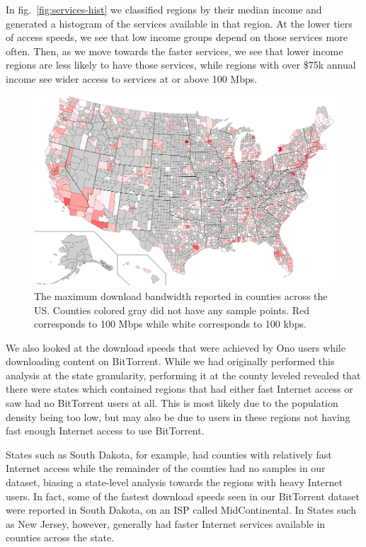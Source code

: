 \documentclass{sig-alternate-10pt}
\begin{document}
In fig.~\ref{fig:services-hist} we classified regions by their median income
and generated a histogram of the services available in that region.  At the
lower tiers of access speeds, we see that low income groups depend on those
services more often.  Then, as we move towards the faster services, we see
that lower income regions are less likely to have those services, while 
regions with over \$75k annual income see wider access to services 
at or above 100 Mbps.

\begin{figure}
\centering
        \includegraphics[width=0.9\linewidth]{figs/counties_btMaxDown.pdf}
  \caption{The maximum download bandwidth reported in counties across the 
US.  Counties colored gray did not have any sample points.  Red corresponds
to 100 Mbps while white corresponds to 100 kbps.}
  \label{fig:services-btMaxDown}
\end{figure}

We also looked at the download speeds that were achieved by Ono users while
downloading content on BitTorrent. While we had originally performed this
analysis at the state granularity, performing it at the county leveled revealed
that there were states which contained regions that had either fast Internet
access or saw had no BitTorrent users at all.  This is most likely due to the
population density being too low, but may also be due to users in these regions
not having fast enough Internet access to use BitTorrent. 

States such as South Dakota, for example, had counties with relatively fast
Internet access while the remainder of the counties had no samples in our
dataset, biasing a state-level analysis towards the regions with heavy Internet
users. In fact, some of the fastest download speeds seen in our BitTorrent
dataset were reported in South Dakota, on an ISP called MidContinental.  In
States such as New Jersey, however, generally had faster Internet services
available in counties across the state.  
\end{document}
